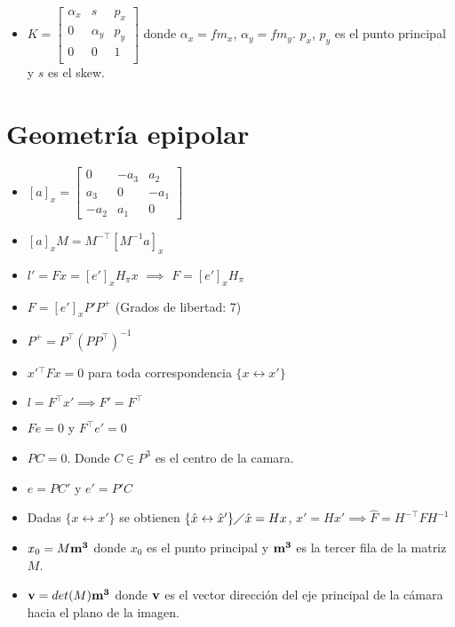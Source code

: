 \documentclass[12pt,a4paper]{article}
\begin{document}
\begin{itemize}
	\item $
	K = \left[ {\begin{smallmatrix}
		\alpha_{x} & s & p_{x}\\ 
	    0 & \alpha_{y} & p_{y}\\
	    0 & 0 & 1\\
	\end{smallmatrix} } \right]
	$ donde $\alpha_{x} = f m_{x}$, $\alpha_{y} = f m_{y}$. $p_{x}$, $p_{y}$ es el punto principal y $s$ es el skew.

\end{itemize}


\section{Geometr\'ia epipolar}

\begin{itemize}
	\item $[a]_{x} = \left[ {\begin{smallmatrix}
		0 & -a_3 & a_2\\ 
		a_3  & 0 & -a_1\\
		-a_2 & a_1 & 0
		\end{smallmatrix} } \right] $

	\item $[a]_{x}M = M^{-\top}[M^{-1}a]_{x}$

	\item $l' = Fx = [e']_{x} H_{\pi} x$ $\implies$ $F = [e']_{x} H_{\pi}$

	\item $F = [e']_{x} P' P^{+}$   \hspace*{1cm}(Grados de libertad: 7)

	\item $P^{+} = P^{\top}(PP^{\top})^{-1}$

	\item ${x'}{}^{\top}Fx =0$ para toda correspondencia $\{x \leftrightarrow x' \}$

	\item $l = F^{\top}x' \implies F' = F^{\top}$

	\item $Fe = 0$ y $F^{\top}e' = 0$

	\item $PC = 0$. Donde $C \in P^{3}$ es el centro de la camara.

	\item $e = PC'$ y $e' = P'C$

	\item Dadas $\{x \leftrightarrow x' \}$ se obtienen  $\{\hat{x} \leftrightarrow \hat{x}' \} \diagup \hat{x} = Hx$, $\hat{x}'=Hx'  \implies \hat{F} = H^{-\top}FH^{-1}$
	
	\item $x_{0} = M{\bf m^{3}}$ donde $x_{0}$ es el punto principal y ${\bf m^{3}}$ es la tercer fila de la matriz $M$.
	
	\item ${\bf v}= det(M){\bf m^{3}}$ donde ${\bf v}$ es el vector direcci\'on del eje principal de la c\'amara hacia el plano de la imagen.

\end{itemize}
\end{document}
